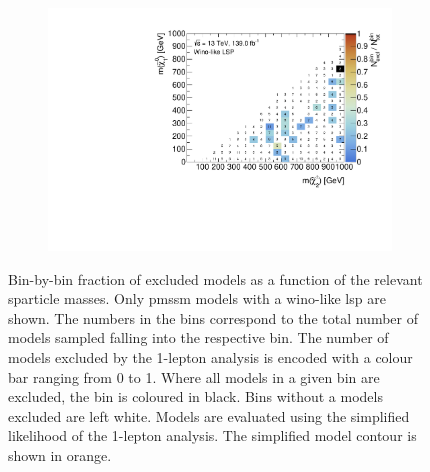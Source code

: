 \begin{figure}
\begin{subfigure}[b]{0.5\linewidth}
		\centering\includegraphics[width=\textwidth]{cut_wino_LSP/mchi10_mchi2p_contour}
		\caption{\label{fig:mchi10_mchi2p_contour_wino_lsp}}
	\end{subfigure}\hfill
	\caption{Bin-by-bin fraction of excluded models as a function of the relevant sparticle masses. Only \gls{pmssm} models with a wino-like \gls{lsp} are shown. The numbers in the bins correspond to the total number of models sampled falling into the respective bin. The number of models excluded by the 1-lepton analysis is encoded with a colour bar ranging from 0 to 1. Where all models in a given bin are excluded, the bin is coloured in black. Bins without a models excluded are left white. Models are evaluated using the simplified likelihood of the 1-lepton analysis. The simplified model contour is shown in orange.}
	\label{fig:impact_electroweakinos_2D_wino_lsp}
\end{figure}

